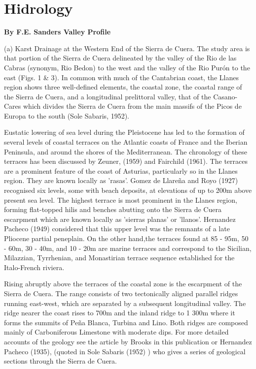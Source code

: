 \documentclass[11pt, a4paper, twoside]{memoir}
\begin{document}
\chapter{Hidrology}
\textbf{By F.E. Sanders Valley Profile}

(a) Karst Drainage at the Western End of the Sierra de Cuera. The study area is that portion of the Sierra de Cuera delineated by the valley of the Rio de las Cabras (synonym, Rio Bedon) to the west and the valley of the Rio Purón to the east (Figs. 1 \& 3). In common with much of the Cantabrian coast, the Llanes region shows three well-defined elements, the coastal zone, the coastal range of the Sierra de Cuera, and a longitudinal prelittoral valley, that of the Casano-Cares which divides the Sierra de Cuera from the main massifs of the Picos de Europa to the south (Sole Sabaris, 1952).

Eustatic lowering of sea level during the Pleistocene has led to the formation of several levels of coastal terraces on the Atlantic coasts of France and the Iberian Peninsula, and around the shores of the Mediterranean. The chronology of these terraces has been discussed by Zeuner, (1959) and Fairchild (1961). The terraces are a prominent feature of the coast of Asturias, particularly so in the Llanes region. They are known locally as 'rasas'. Gomez de Llareña and Royo (1927) recognised six levels, some with beach deposits, at elevations of up to 200m above present sea level. The highest terrace is most prominent in the Llanes region, forming flat-topped hilis and benches abutting onto the Sierra de Cuera escarpment which are known locally as 'sierras planas' or 'llanos'. Hernandez Pacheco (1949) considered that this upper level was the remnants of a late Pliocene partial peneplain. On the other hand,the terraces found at 85 - 95m, 50 - 60m, 30 - 40m, and 10 - 20m are marine terraces and correspond to the Sicilian, Milazzian, Tyrrhenian, and Monastirian terrace sequence established for the Italo-French riviera.

Rising abruptly above the terraces of the coastal zone is the escarpment of the Sierra de Cuera. The range consists of two tectonically aligned parallel ridges running east-west, which are separated by a subsequent longitudinal valley. The ridge nearer the coast rises to 700m and the inland ridge to 1 300m where it forms the summits of Peña Blanca, Turbina and Lino. Both ridges are composed mainly of Carboniferous Limestone with moderate dips. For more detailed accounts of the geology see the article by Brooks in this publication or Hernandez Pacheco (1935), (quoted in Sole Sabaris (1952) ) who gives a series of geological sections through the Sierra de Cuera.
\end{document}
